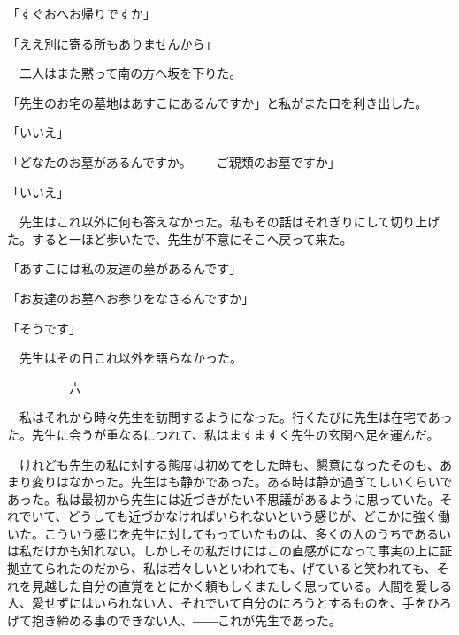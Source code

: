 \documentclass[a4j,onecolumn]{tarticle}
\begin{document}
「すぐおへお帰りですか」\par{}
「ええ別に寄る所もありませんから」\par{}
　二人はまた黙って南の方へ坂を下りた。\hbox{}\par{}
「先生のお宅の墓地はあすこにあるんですか」と私がまた口を利き出した。\hbox{}\par{}
「いいえ」\par{}
「どなたのお墓があるんですか。\hbox{}――ご親類のお墓ですか」\par{}
「いいえ」\par{}
　先生はこれ以外に何も答えなかった。\hbox{}私もその話はそれぎりにして切り上げた。\hbox{}すると一ほど歩いたで、\hbox{}先生が不意にそこへ戻って来た。\hbox{}\par{}
「あすこには私の友達の墓があるんです」\par{}
「お友達のお墓へお参りをなさるんですか」\par{}
「そうです」\par{}
　先生はその日これ以外を語らなかった。\hbox{}\par{}\par{}　　　　　六
\par{}
　私はそれから時々先生を訪問するようになった。\hbox{}行くたびに先生は在宅であった。\hbox{}先生に会うが重なるにつれて、\hbox{}私はますますく先生の玄関へ足を運んだ。\hbox{}\par{}
　けれども先生の私に対する態度は初めてをした時も、\hbox{}懇意になったそのも、\hbox{}あまり変りはなかった。\hbox{}先生はも静かであった。\hbox{}ある時は静か過ぎてしいくらいであった。\hbox{}私は最初から先生には近づきがたい不思議があるように思っていた。\hbox{}それでいて、\hbox{}どうしても近づかなければいられないという感じが、\hbox{}どこかに強く働いた。\hbox{}こういう感じを先生に対してもっていたものは、\hbox{}多くの人のうちであるいは私だけかも知れない。\hbox{}しかしその私だけにはこの直感がになって事実の上に証拠立てられたのだから、\hbox{}私は若々しいといわれても、\hbox{}げていると笑われても、\hbox{}それを見越した自分の直覚をとにかく頼もしくまたしく思っている。\hbox{}人間を愛しる人、\hbox{}愛せずにはいられない人、\hbox{}それでいて自分のにろうとするものを、\hbox{}手をひろげて抱き締める事のできない人、\hbox{}――これが先生であった。\hbox{}\par{}
\end{document}

